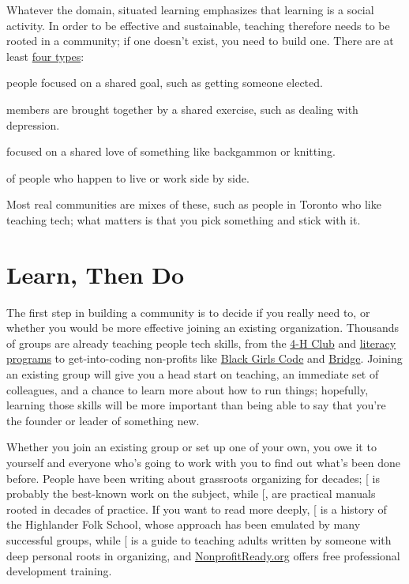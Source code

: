 Whatever the domain, situated learning emphasizes that learning is a
social activity. In order to be effective and sustainable, teaching
therefore needs to be rooted in a community; if one doesn't exist, you
need to build one. There are at least \href{https://www.feverbee.com/types-of-community-and-activity-within-the-community/}{four types}:

\begin{description}
\tightlist
\item[Community of action:]
people focused on a shared goal, such as getting someone elected.
\item[Community of concern:]
members are brought together by a shared exercise, such as dealing
with depression.
\item[Community of interest:]
focused on a shared love of something like backgammon or knitting.
\item[Community of place:]
of people who happen to live or work side by side.
\end{description}

Most real communities are mixes of these, such as people in Toronto who
like teaching tech; what matters is that you pick something and stick
with it.

\section{Learn, Then Do}\label{s:community-learn-then-do}

The first step in building a community is to decide if you really need
to, or whether you would be more effective joining an existing
organization. Thousands of groups are already teaching people tech
skills, from the \href{http://www.4-h-canada.ca/}{4-H Club} and \href{https://www.frontiercollege.ca/}{literacy
programs} to get-into-coding non-profits like \href{http://www.blackgirlscode.com/}{Black
Girls Code} and \href{http://bridgeschool.io/}{Bridge}. Joining an
existing group will give you a head start on teaching, an immediate
set of colleagues, and a chance to learn more about how to run things;
hopefully, learning those skills will be more important than being
able to say that you're the founder or leader of something new.

Whether you join an existing group or set up one of your own, you owe
it to yourself and everyone who's going to work with you to find out
what's been done before. People have been writing about grassroots
organizing for decades; {[}\protect[\hyperlink{b:Alin1989}{Alin1989}]{]} is probably the best-known
work on the subject, while {[},\protect[\hyperlink{b:Midw2010}{Midw2010}]{]} are
practical manuals rooted in decades of practice. If you want to read
more deeply, {[}\protect[\hyperlink{b:Adam1975}{Adam1975}]{]} is a history of the Highlander Folk
School, whose approach has been emulated by many successful groups,
while {[}\protect[\hyperlink{b:Spal2014}{Spal2014}]{]} is a guide to teaching adults written by
someone with deep personal roots in organizing, and
\href{https://www.nonprofitready.org/}{NonprofitReady.org} offers free professional
development training.

